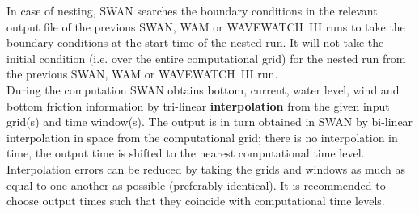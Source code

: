 \documentclass[12pt]{book}
\begin{document}
In case of nesting, SWAN searches the boundary conditions in the relevant output file of the previous
SWAN, WAM or WAVEWATCH~III runs to take the boundary conditions at the start time of the nested run.
It will not take the initial condition (i.e. over the entire computational grid) for the nested run
from the previous SWAN, WAM or WAVEWATCH~III run.
\\[2ex]
\noindent
During the computation SWAN obtains bottom, current, water level, wind and bottom friction information
by tri-linear {\bf interpolation} from the given input grid(s) and time window(s). The output is in turn
obtained in SWAN by bi-linear interpolation in space from the computational grid; there is no interpolation
in time, the output time is shifted to the nearest computational time level. Interpolation errors can be
reduced by taking the grids and windows as much as equal to one another as possible (preferably identical).
It is recommended to choose output times such that they coincide with computational time levels.
\end{document}
